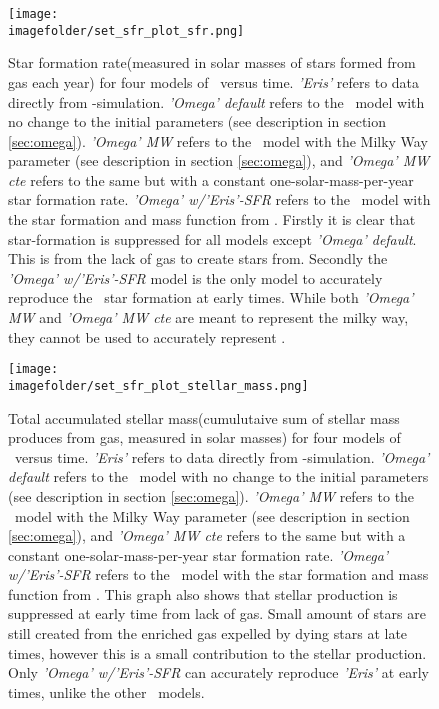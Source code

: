 \begin{figure}[h]
  \centering
  \texttt{[image: \\imagefolder/set\_sfr\_plot\_sfr.png]}
  \caption{\label{img:fit-v0-sfr}
    Star formation rate(measured in solar masses of stars formed from gas each year) for four models of \omegamodel\ versus time. 
    \textit{'Eris'} refers to data directly from \eris -simulation. \textit{'Omega' default} refers to the \omegamodel\ model with no change to the initial parameters (see description in section \ref{sec:omega}). \textit{'Omega' MW} refers to the \omegamodel\ model with the Milky Way parameter (see description in section \ref{sec:omega}), and \textit{'Omega' MW cte} refers to the same but with a constant one-solar-mass-per-year star formation rate. \textit{'Omega' w/'Eris'-SFR} refers to the \omegamodel\ model with the star formation and mass function from \eris.
    Firstly it is clear that star-formation is suppressed for all models except \textit{'Omega' default}. This is from the lack of gas to create stars from. Secondly the \textit{'Omega' w/'Eris'-SFR} model is the only model to accurately reproduce the \eris\ star formation at early times. While both \textit{'Omega' MW} and \textit{'Omega' MW cte} are meant to represent the milky way, they cannot be used to accurately represent \eris.
  }
\end{figure}
\begin{figure}[h]
  \centering
  \texttt{[image: \\imagefolder/set\_sfr\_plot\_stellar\_mass.png]}
  \caption{\label{img:fit-v0-stellarmass}
    Total accumulated stellar mass(cumulutaive sum of stellar mass produces from gas, measured in solar masses) for four models of \omegamodel\ versus time.
    \textit{'Eris'} refers to data directly from \eris -simulation. \textit{'Omega' default} refers to the \omegamodel\ model with no change to the initial parameters (see description in section \ref{sec:omega}). \textit{'Omega' MW} refers to the \omegamodel\ model with the Milky Way parameter (see description in section \ref{sec:omega}), and \textit{'Omega' MW cte} refers to the same but with a constant one-solar-mass-per-year star formation rate. \textit{'Omega' w/'Eris'-SFR} refers to the \omegamodel\ model with the star formation and mass function from \eris.
    This graph also shows that stellar production is suppressed at early time from lack of gas. Small amount of stars are still created from the enriched gas expelled by dying stars at late times, however this is a small contribution to the stellar production. Only \textit{'Omega' w/'Eris'-SFR} can accurately reproduce \textit{'Eris'} at early times, unlike the other \omegamodel\ models.
  }
\end{figure}
